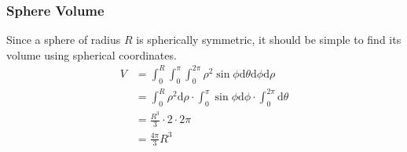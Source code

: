 \subsubsection{Sphere Volume}
\noindent
Since a sphere of radius $R$ is spherically symmetric, it should be simple to find its volume using spherical coordinates.
\begin{align*}
	V &= \int_{0}^{R}{\int_{0}^{\pi}{\int_{0}^{2\pi}{\rho^2\sin{\phi}\mathrm{d}\theta}\mathrm{d}\phi}\mathrm{d}\rho}	\\
	&= \int_{0}^{R}{\rho^2\mathrm{d}\rho} \cdot \int_{0}^{\pi}{\sin{\phi}\mathrm{d}\phi} \cdot \int_{0}^{2\pi}{\mathrm{d}\theta} \\
	&= \frac{R^3}{3} \cdot 2 \cdot 2\pi \\
	&= \frac{4\pi}{3}R^3
\end{align*}